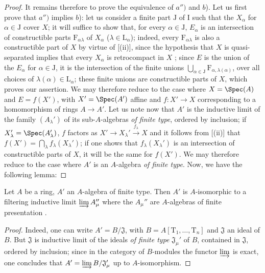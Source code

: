 \begin{proof}
It remains therefore to prove the equivalence of $a'')$ and $b$).
Let us first prove that $a'')$ implies $b$): let us consider a finite part $\mathrm{J}$ of $\mathrm{I}$ such that the $X_\alpha$ for $\alpha\in\mathrm{J}$ cover $X$; it will suffice to show that, for every $\alpha\in\mathrm{J}$, $E_\alpha$ is an intersection of constructible parts $\mathrm{F}_{\alpha\lambda}$ of $X_\alpha$ ($\lambda\in\mathrm{L}_\alpha$); indeed, every $\mathrm{F}_{\alpha\lambda}$ is also a constructible part of $X$ by virtue of [(ii)], since the hypothesis that $X$ is quasi-separated implies that every $X_\alpha$ is retrocompact in $X$ ; since $E$ is the union of the $E_\alpha$ for $\alpha\in\mathrm{J}$, it is the intersection of the finite unions $\bigcup_{\alpha\in\mathrm{J}} \mathrm{F}_{\alpha,\lambda(\alpha)}$, over all choices of $\lambda(\alpha)\in\mathrm{L}_\alpha$; these finite unions are constructible parts of $X$, which proves our assertion.
We may therefore reduce to the case
where $X=\Spec(A)$ and $E=f(X')$, with $X'=\Spec(A')$ affine and $f:X'\to X$ corresponding to a homomorphism of rings $A\to A'$.
Let us note now that $A'$ is the inductive limit of the family $(A_\lambda')$ of its sub-$A$-algebras \emph{of finite type}, ordered by inclusion; if $X_\lambda'=\Spec(A_\lambda')$, $f$ factors as $X'\to X_\lambda'\xrightarrow{f_\lambda} X$ and it follows from [(ii)] that $f(X')=\bigcap_\lambda f_\lambda(X_\lambda')$; if one shows that $f_\lambda(X_\lambda')$ is an intersection of constructible parts of $X$, it will be the same for $f(X')$.
We may therefore reduce to the case where $A'$ is an $A$-algebra \emph{of finite type}.
Now, we have the following lemma:
\end{proof}

\begin{lemma}[1.9.3.1]
\label{IV.1.9.3.1}
Let $A$ be a ring, $A'$ an $A$-algebra of finite type.
Then $A'$ is $A$-isomorphic to a filtering inductive limit $\varinjlim A_\mu''$ where the $A_\mu''$ are $A$-algebras of finite presentation .
\end{lemma}

\begin{proof}
Indeed, one can write $A'=B/\mathfrak{J}$, with $B=A[\mathrm{T}_1,\ldots,\mathrm{T}_n]$ and $\mathfrak{J}$ an ideal of $B$.
But $\mathfrak{J}$ is inductive limit of the ideals \emph{of finite type} $\mathfrak{J}_\mu'$ of $B$, contained in $\mathfrak{J}$, ordered by inclusion; since in the category of $B$-modules the functor $\varinjlim$ is exact, one concludes that $A'=\varinjlim B/\mathfrak{J}_\mu'$ up to $A$-isomorphism.
\end{proof}

